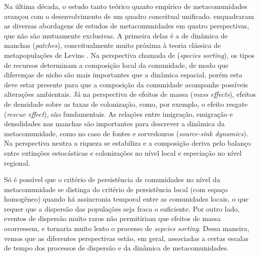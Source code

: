 \documentclass[12pt]{extarticle}
\begin{document}
Na última década, o estudo tanto teórico quanto empírico de metacomunidades
\citep{logue2011} avançou com o desenvolvimento de um
quadro conceitual unificado.  \citet{leibold2004} enquadraram as diversas
abordagens de estudos de metacomunidades em quatro perspectivas, que não são
mutuamente exclusivas. A primeira delas é a de dinâmica de manchas
(\emph{patches}), conceitualmente muito próxima à teoria clássica de
metapopulações de Levins \citep{levins1969,levins1971}. 
Na perspectiva chamada de %
(\emph{species sorting}), os tipos de recursos determinam a composição local da comunidade,
de modo que diferenças de nicho são mais importantes que a dinâmica espacial,
porém esta deve estar presente para que a composição da comunidade acompanhe
possíveis alterações ambientais.  
Já na perspectiva de efeitos de massa
(\emph{mass effects}), efeitos de densidade sobre as taxas de colonização, como, por exemplo, o efeito
resgate (\emph{rescue effect}), são fundamentais. As relações entre imigração, emigração e densdidades nas manchas
são importantes para descrever a dinâmica da metacomunidade, como no caso de fontes e sorvedouros (\emph{source-sink dynamics}).
Na perspectiva neutra a riqueza se estabiliza e a composição deriva 
pelo  balanço entre extinções estocásticas e colonizações no nível local 
e especiação no nível regional. %

Só é possível que o critério de persistência de comunidades no nível da
metacomunidade se distinga do critério de persistência local (com espaço
homogêneo) quando há assincronia temporal entre as comunidades locais, o que
requer que a dispersão das populações seja fraca o suficiente. %
Por outro lado, eventos
de dispersão muito raros não permitiriam que efeitos de massa ocorressem, e
tornaria muito lento o processo de \emph{sepcies sorting}. Dessa maneira,
vemos que as diferentes perspectivas estão, em geral, associadas a certas
escalas de tempo dos processos de dispersão e da dinâmica de metacomunidades.
\end{document}
